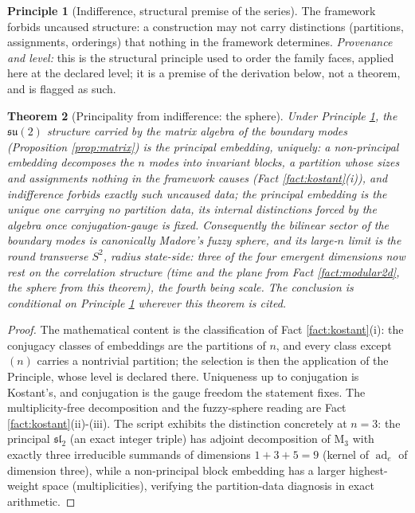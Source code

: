 \documentclass[11pt]{article}
\newtheorem{theorem}{Theorem}[section]
\theoremstyle{definition}
\newtheorem{principle}[theorem]{Principle}
\newcommand{\Mat}{\mathrm{M}}
\begin{document}
\begin{principle}[Indifference, structural premise of the series]\label{prin:indiff}
The framework forbids uncaused structure: a construction may not carry distinctions (partitions, assignments, orderings) that nothing in the framework determines. \emph{Provenance and level:} this is the structural principle used to order the family faces, applied here at the declared level; it is a premise of the derivation below, not a theorem, and is flagged as such.
\end{principle}

\begin{theorem}[Principality from indifference: the sphere]\label{thm:sphere}
Under Principle \ref{prin:indiff}, the $\mathfrak{su}(2)$ structure carried by the matrix algebra of the boundary modes (Proposition \ref{prop:matrix}) is the principal embedding, uniquely: a non-principal embedding decomposes the $n$ modes into invariant blocks, a partition whose sizes and assignments nothing in the framework causes (Fact \ref{fact:kostant}(i)), and indifference forbids exactly such uncaused data; the principal embedding is the unique one carrying no partition data, its internal distinctions forced by the algebra once conjugation-gauge is fixed. Consequently the bilinear sector of the boundary modes is canonically Madore's fuzzy sphere, and its large-$n$ limit is the round transverse $S^2$, radius state-side: three of the four emergent dimensions now rest on the correlation structure (time and the plane from Fact \ref{fact:modular2d}, the sphere from this theorem), the fourth being scale. The conclusion is conditional on Principle \ref{prin:indiff} wherever this theorem is cited.
\end{theorem}

\begin{proof}
The mathematical content is the classification of Fact \ref{fact:kostant}(i): the conjugacy classes of embeddings are the partitions of $n$, and every class except $(n)$ carries a nontrivial partition; the selection is then the application of the Principle, whose level is declared there. Uniqueness up to conjugation is Kostant's, and conjugation is the gauge freedom the statement fixes. The multiplicity-free decomposition and the fuzzy-sphere reading are Fact \ref{fact:kostant}(ii)-(iii). The script exhibits the distinction concretely at $n = 3$: the principal $\mathfrak{sl}_2$ (an exact integer triple) has adjoint decomposition of $\Mat_3$ with exactly three irreducible summands of dimensions $1 + 3 + 5 = 9$ (kernel of $\operatorname{ad}_e$ of dimension three), while a non-principal block embedding has a larger highest-weight space (multiplicities), verifying the partition-data diagnosis in exact arithmetic.
\end{proof}
\end{document}

